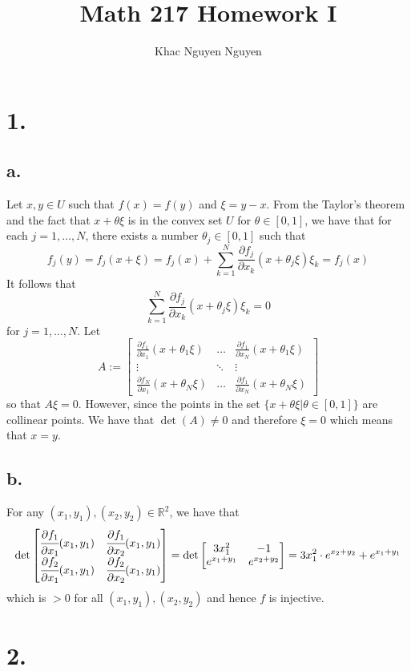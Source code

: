 \documentclass[11pt]{article}
\title{\textbf{Math 217 Homework I}}
\author{Khac Nguyen Nguyen}
\date{}
\begin{document}
\section*{1.}
\subsection*{a.}
Let $x, y \in U$ such that $f(x) = f(y)$ and $\xi =  y-x$. 
From the Taylor's theorem and the fact that $x+\theta \xi$ is in the convex set $U$ for $\theta \in [0,1]$, we have that for each $j= 1,\ldots, N$, there exists a number $\theta_j \in [0,1]$ such that
\[
    f_j(y) = f_j(x+\xi) = f_j(x) + \sum_{k=1}^N \frac{\partial f_j}{\partial x_k}(x+\theta_j \xi)\xi_k = f_j(x)   
\]
It follows that 
\[
    \sum_{k=1}^N \frac{\partial f_j}{\partial x_k}(x+\theta_j \xi)\xi_k = 0
\]
for $j = 1, \ldots, N$. Let 
\[
    A:=
    \begin{bmatrix}
        \frac{\partial f_1}{\partial x_1}(x+\theta_1 \xi) & \hdots &\frac{\partial f_1}{\partial x_N}(x+\theta_1 \xi) \\
        \vdots & \ddots & \vdots \\
        \frac{\partial f_N}{\partial x_1}(x+\theta_N \xi) & \hdots &\frac{\partial f_1}{\partial x_N}(x+\theta_N \xi)
    \end{bmatrix}    
\]
so that $A\xi = 0$. However, since the points in the set $\{x + \theta\xi | \theta \in [0,1]\}$ are collinear points.
We have that $\det(A) \ne 0$ and therefore $\xi=0$ which  means that $x=y$.
\subsection*{b.}
For any $(x_1,y_1), (x_2, y_2) \in \mathbb{R}^2$, we have that
\[
    \det 
    \begin{bmatrix}
        \cfrac{\partial f_1}{\partial x_1}(x_1,y_1) & \cfrac{\partial f_1}{\partial x_2}(x_1,y_1)  \\
        \cfrac{\partial f_2}{\partial x_1}(x_1,y_1) & \cfrac{\partial f_2}{\partial x_2}(x_1,y_1)  
    \end{bmatrix}   
    = \det 
    \begin{bmatrix}
        3x_1^2 & -1 \\
        e^{x_1+y_1} & e^{x_2+y_2}  
    \end{bmatrix}
    = 3x_1^2 \cdot e^{x_2+y_2} + e^{x_1 + y_1}
\]
which is $>0$ for all $(x_1,y_1), (x_2, y_2)$ and hence $f$ is injective.
\pagebreak
\section*{2.}
\end{document}
